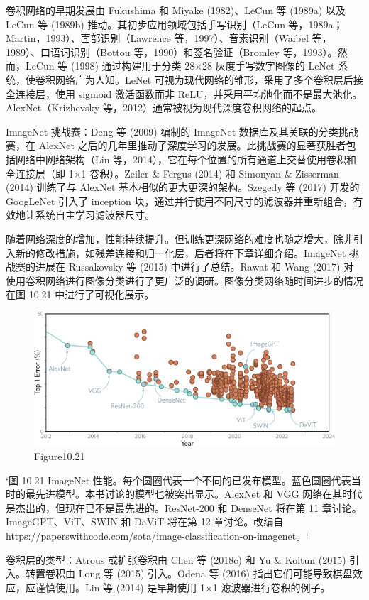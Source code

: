 卷积网络的早期发展由 Fukushima 和 Miyake (1982)、LeCun 等 (1989a) 以及 LeCun 等 (1989b) 推动。其初步应用领域包括手写识别（LeCun 等，1989a；Martin，1993）、面部识别（Lawrence 等，1997）、音素识别（Waibel 等，1989）、口语词识别（Bottou 等，1990）和签名验证（Bromley 等，1993）。然而，LeCun 等 (1998) 通过构建用于分类 28×28 灰度手写数字图像的 LeNet 系统，使卷积网络广为人知。LeNet 可视为现代网络的雏形，采用了多个卷积层后接全连接层，使用 sigmoid 激活函数而非 ReLU，并采用平均池化而不是最大池化。AlexNet（Krizhevsky 等，2012）通常被视为现代深度卷积网络的起点。

ImageNet 挑战赛：Deng 等 (2009) 编制的 ImageNet 数据库及其关联的分类挑战赛，在 AlexNet 之后的几年里推动了深度学习的发展。此挑战赛的显著获胜者包括网络中网络架构（Lin 等，2014），它在每个位置的所有通道上交替使用卷积和全连接层（即 1×1 卷积）。Zeiler & Fergus (2014) 和 Simonyan & Zisserman (2014) 训练了与 AlexNet 基本相似的更大更深的架构。Szegedy 等 (2017) 开发的 GoogLeNet 引入了 inception 块，通过并行使用不同尺寸的滤波器并重新组合，有效地让系统自主学习滤波器尺寸。

随着网络深度的增加，性能持续提升。但训练更深网络的难度也随之增大，除非引入新的修改措施，如残差连接和归一化层，后者将在下章详细介绍。ImageNet 挑战赛的进展在 Russakovsky 等 (2015) 中进行了总结。Rawat 和 Wang (2017) 对使用卷积网络进行图像分类进行了更广泛的调研。图像分类网络随时间进步的情况在图 10.21 中进行了可视化展示。


\begin{figure}[h!]
\centering
\includegraphics[width=0.7\linewidth]{png/chapter10/ConvImageNetPerformance.png}
\caption{Figure10.21}
\end{figure}
`图 10.21 ImageNet 性能。每个圆圈代表一个不同的已发布模型。蓝色圆圈代表当时的最先进模型。本书讨论的模型也被突出显示。AlexNet 和 VGG 网络在其时代是杰出的，但现在已不是最先进的。ResNet-200 和 DenseNet 将在第 11 章讨论。ImageGPT、ViT、SWIN 和 DaViT 将在第 12 章讨论。改编自 https://paperswithcode.com/sota/image-classification-on-imagenet。`

卷积层的类型：Atrous 或扩张卷积由 Chen 等 (2018c) 和 Yu & Koltun (2015) 引入。转置卷积由 Long 等 (2015) 引入。Odena 等 (2016) 指出它们可能导致棋盘效应，应谨慎使用。Lin 等 (2014) 是早期使用 1×1 滤波器进行卷积的例子。


